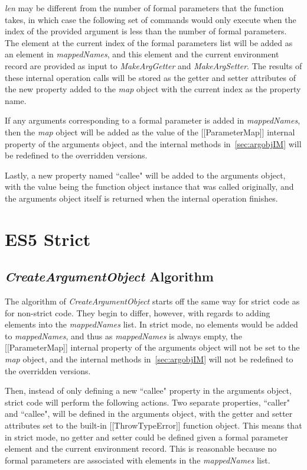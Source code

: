 \documentclass[a4paper,11pt,twoside]{report}
\begin{document}
\textit{len} may be different from the number of formal parameters that the function takes, in which case the following set of commands would only execute when the index of the provided argument is less than the number of formal parameters. The element at the current index of the formal parameters list will be added as an element in \textit{mappedNames}, and this element and the current environment record are provided as input to \textit{MakeArgGetter} and \textit{MakeArgSetter}. The results of these internal operation calls will be stored as the getter and setter attributes of the new property added to the \textit{map} object with the current index as the property name.

If any arguments corresponding to a formal parameter is added in \textit{mappedNames}, then the \textit{map} object will be added as the value of the [[ParameterMap]] internal property of the arguments object, and the internal methods in~\ref{sec:argobjIM} will be redefined to the overridden versions.

Lastly, a new property named ``callee" will be added to the arguments object, with the value being the function object instance that was called originally, and the arguments object itself is returned when the internal operation finishes.

\section{ES5 Strict}
\subsection{\textit{CreateArgumentObject} Algorithm}
The algorithm of \textit{CreateArgumentObject} starts off the same way for strict code as for non-strict code. They begin to differ, however, with regards to adding elements into the \textit{mappedNames} list. In strict mode, no elements would be added to \textit{mappedNames}, and thus as \textit{mappedNames} is always empty, the [[ParameterMap]] internal property of the arguments object will not be set to the \textit{map} object, and the internal methods in~\ref{sec:argobjIM} will not be redefined to the overridden versions.

Then, instead of only defining a new ``callee" property in the arguments object, strict code will perform the following actions. Two separate properties, ``caller" and ``callee", will be defined in the arguments object, with the getter and setter attributes set to the built-in [[ThrowTypeError]] function object. This means that in strict mode, no getter and setter could be defined given a formal parameter element and the current environment record. This is reasonable because no formal parameters are associated with elements in the \textit{mappedNames} list.
\end{document}
